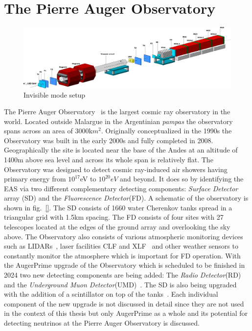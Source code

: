 
\chapter{The Pierre Auger Observatory}
\label{sec:setup}
\begin{figure}[h!]
\centering
\includegraphics[width=\textwidth]{thesis_figures/Invisible_3d_setup.png}
\caption{Invisible mode setup~\cite{Banerjee:2016tad}}
\label{fig:Invisible_mode_setup}
\end{figure}

The Pierre Auger Observatory~\cite{} is the largest cosmic ray observatory in the world. Located outside Malargue in the Argentinian \textit{pampas} the observatory spans across an area of 3000k$m^2$. Originally conceptualized in the 1990s the Observatory was built in the early 2000s and fully completed in 2008. Geographically the site is located near the base of the Andes at an altitude of 1400m above sea level and across its whole span is relatively flat. The Observatory was designed to detect cosmic ray-induced air showers having primary energy from $10^{17}$eV to $10^{20}eV$ and beyond. It does so by identifying the EAS via two different complementary detecting components: \textit{Surface Detector} array (SD) and the \textit{Fluorescence Detector}(FD). A schematic of the observatory is shown in fig.~\ref{}. The SD consists of 1660 water Cherenkov tanks spread in a triangular grid with 1.5km spacing. The FD consists of four sites with 27 telescopes located at the edges of the ground array and overlooking the sky above. The Observatory also consists of various atmospheric monitoring devices such as LIDARs~\cite{}, laser facilities CLF and XLF~\cite{} and other weather sensors to constantly monitor the atmosphere which is important for FD operation. With the AugerPrime upgrade of the Observatory which is scheduled to be finished in 2024 two new detecting components are being added: The \textit{Radio Detector}(RD)~\cite{} and the \textit{Underground Muon Detector}(UMD)~\cite{}. The SD is also being upgraded with the addition of a scintillator on top of the tanks~\cite{}. Each individual component of the new upgrade is not discussed in detail since they are not used in the context of this thesis but only AugerPrime as a whole and its potential for detecting neutrinos at the Pierre Auger Observatory is discussed.

